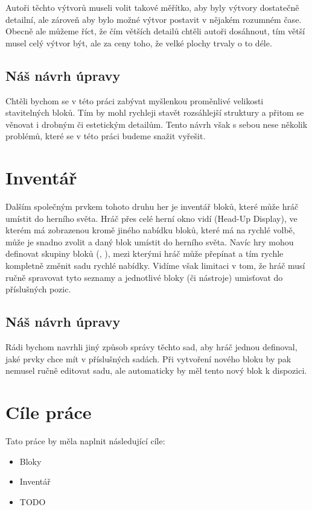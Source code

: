 Autoři těchto výtvorů museli volit takové měřítko, aby byly výtvory dostatečně detailní, ale zároveň aby bylo možné výtvor postavit v nějakém rozumném čase. Obecně ale můžeme říct, že čím větších detailů chtěli autoři dosáhnout, tím větší musel celý výtvor být, ale za ceny toho, že velké plochy trvaly o to déle.


\subsection{Náš návrh úpravy}
Chtěli bychom se v této práci zabývat myšlenkou proměnlivé velikosti stavitelných bloků. Tím by mohl rychleji stavět rozsáhlejší struktury a přitom se věnovat i drobným či estetickým detailům. Tento návrh však s sebou nese několik problémů, které se v této práci budeme snažit vyřešit.



\section{Inventář}
Dalším společným prvkem tohoto druhu her je inventář bloků, které může hráč umístit do herního světa. Hráč přes celé herní okno vidí \HUD{}(Head-Up Display)\citep{hud_terminology}, ve kterém má zobrazenou kromě jiného nabídku bloků, které má na rychlé volbě, může je snadno zvolit a daný blok umístit do herního světa. Navíc hry mohou definovat skupiny bloků (\SE{}, \ME{}), mezi kterými hráč může přepínat a tím rychle kompletně změnit sadu rychlé nabídky. Vidíme však limitaci v tom, že hráč musí ručně spravovat tyto seznamy a jednotlivé bloky (či nástroje) umisťovat do příslušných pozic.


\subsection{Náš návrh úpravy}
Rádi bychom navrhli jiný způsob správy těchto sad, aby hráč jednou definoval, jaké prvky chce mít v příslušných sadách. Při vytvoření nového bloku by pak nemusel ručně editovat sadu, ale automaticky by měl tento nový blok k dispozici.  




\section{Cíle práce}
Tato práce by měla naplnit následující cíle:
\begin{itemize}
	\item Bloky
	\item Inventář
	\item TODO
\end{itemize}

